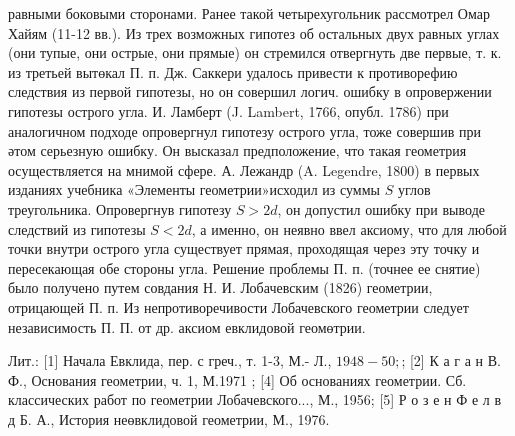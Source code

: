 \documentclass[10pt]{article}
\begin{document}
равными боковыми сторонами. Ранее такой четырехугольник рассмотрел Омар Хайям (11-12 вв.). Из трех возможных гипотез об остальных двух равных углах (они тупые, они острые, они прямые) он стремился отвергнуть две первые, т. к. из третьей вытөкал П. п. Дж. Саккери удалось привести к противорефию следствия из первой гипотезы, но он совершил логич. ошибку в опровержении гипотезы острого угла. И. Ламберт (J. Lambert, 1766, опубл. 1786) при аналогичном подходе опровергнул гипотезу острого угла, тоже совершив при әтом серьезную ошибку. Он высказал предположение, что такая геометрия осуществляется на мнимой сфере. А. Лежандр (A. Legendre, 1800) в первых изданиях учебника «Элементы геометрии»исходил из суммы $S$ углов треугольника. Опровергнув гипотезу $S>2 d$, он допустил ошибку при выводе следствий из гипотезы $S<2 d$, а именно, он неявно ввел аксиому, что для любой точки внутри острого угла существует прямая, проходящая через эту точку и пересекающая обе стороны угла. Решение проблемы П. п. (точнее ее снятие) было получено путем совдания Н. И. Лобачевским (1826) геометрии, отрицающей П. п. Из непротиворечивости Лобачевского геометрии следует независимость П. П. от др. аксиом евклидовой геомөтрии.



Лит.: [1] Начала Евклида, пер. с греч., т. 1-3, М.- Л., $1948-50 ;$; [2] К а г а н В. Ф., Основания геометрии, ч. 1, М.1971 ; [4] Об основаниях геометрии. Сб. классических работ по геометрии Лобачевского..., М., 1956; [5] Р о з е н Ф е л в д Б. А., История неөвклидовой геометрии, М., 1976.
\end{document}
